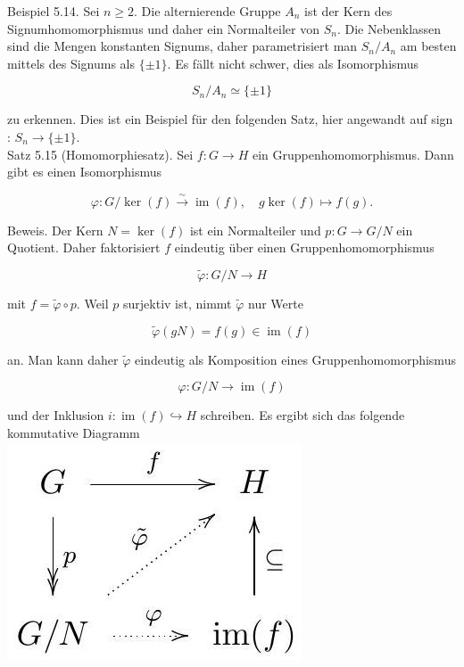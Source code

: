 \documentclass[10pt, letterpaper]{article}
\begin{document}
Beispiel 5.14. Sei $n \geq 2$. Die alternierende Gruppe $A_{n}$ ist der Kern des Signumhomomorphismus und daher ein Normalteiler von $S_{n}$. Die Nebenklassen sind die Mengen konstanten Signums, daher parametrisiert man $S_{n} / A_{n}$ am besten mittels des Signums als $\{ \pm 1\}$. Es fällt nicht schwer, dies als Isomorphismus

$$
S_{n} / A_{n} \simeq\{ \pm 1\}
$$

zu erkennen. Dies ist ein Beispiel für den folgenden Satz, hier angewandt auf sign : $S_{n} \rightarrow\{ \pm 1\}$.\\
Satz 5.15 (Homomorphiesatz). Sei $f: G \rightarrow H$ ein Gruppenhomomorphismus. Dann gibt es einen Isomorphismus

$$
\varphi: G / \operatorname{ker}(f) \xrightarrow{\sim} \operatorname{im}(f), \quad g \operatorname{ker}(f) \mapsto f(g) .
$$

Beweis. Der Kern $N=\operatorname{ker}(f)$ ist ein Normalteiler und $p: G \rightarrow G / N$ ein Quotient. Daher faktorisiert $f$ eindeutig über einen Gruppenhomomorphismus

$$
\tilde{\varphi}: G / N \rightarrow H
$$

mit $f=\tilde{\varphi} \circ p$. Weil $p$ surjektiv ist, nimmt $\tilde{\varphi}$ nur Werte

$$
\tilde{\varphi}(g N)=f(g) \in \operatorname{im}(f)
$$

an. Man kann daher $\tilde{\varphi}$ eindeutig als Komposition eines Gruppenhomomorphismus

$$
\varphi: G / N \rightarrow \operatorname{im}(f)
$$

und der Inklusion $i: \operatorname{im}(f) \hookrightarrow H$ schreiben. Es ergibt sich das folgende kommutative Diagramm\\
\includegraphics[max width=\textwidth, center]{2025_06_13_6ba93caed1e95a95104eg-039}
\end{document}
